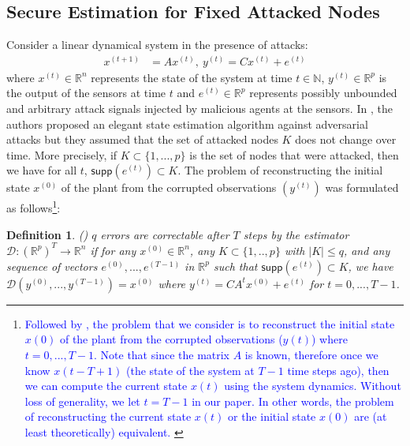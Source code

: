 \documentclass[twocolumn]{autart}    %
\newtheorem{Def}{\bf{Definition}}
\newcommand{\rev}[1]{{\normalsize{{{\color{blue}#1}}}}}
\begin{document}
\subsection{Secure Estimation for Fixed Attacked Nodes \cite{Fawzi2014} }
\vspace{-0.4cm}
Consider a linear dynamical system in the presence of attacks:
\begin{eqnarray}
		x^{(t+1)} &= A x^{(t)}, ~y^{(t)} = C x ^{(t)} + e^{(t)}
		\label{eq:system_model}
\end{eqnarray}
where $x^{(t)}\in \mathbb{R}^n$ represents the state of the system at time $t\in \mathbb{N}$, $y^{(t)} \in \mathbb{R}^p$ is the output of the sensors at time $t$ and $e^{(t)} \in \mathbb{R}^p $ represents \rev{possibly unbounded and arbitrary} attack signals injected by malicious agents at the sensors. In \cite{Fawzi2014}, the authors proposed an elegant state estimation algorithm against adversarial attacks but they assumed that the set of attacked nodes $K$ does not change over time. More precisely, if $K \subset \{1, ..., p\}$ is the set of nodes that were attacked, then we have for all $t$, $\textsf{supp}(e^{(t)})\subset K$. The problem of reconstructing the initial state $x^{(0)}$ of the plant from the corrupted observations $( y^{(t)})$ was formulated as follows\rev{\footnote{ \textcolor{blue}{Followed by \cite{Fawzi2014}, the problem that we consider is to reconstruct the initial state $x(0)$ of the plant from the corrupted observations ($y(t)$) where $t=0,...,T-1$. Note that since the matrix $A$ is known, therefore once we know $x(t-T+1)$ (the state of the system at $T-1$ time steps ago), then we can compute the current state $x(t)$ using the system dynamics. Without loss of generality, we let $t=T-1$ in our paper. In other words, the problem of reconstructing the current state $x(t)$ or the initial state $x(0)$ are (at least theoretically) equivalent. }}}:
\vspace{-0.2cm}
\begin{Def} \emph{(\hspace{1sp}\cite{Fawzi2014})} 
$q$ errors are correctable after $T$ steps by the \rev{estimator} $\mathcal{D}: {(\mathbb{R} ^p) } ^T  \rightarrow \mathbb{R}^n$ if for any $x^{(0)} \in \mathbb{R}^n$, any $K \subset \{1,.., p\} $ with $\lvert K \rvert \le q$, and any sequence of vectors $e^{(0)},...,e^{(T-1)}$ in $\mathbb{R}^p$ such that $\textsf{supp}(e^{(t)}) \subset K$, we have $\mathcal{D} (y^{(0)},...,y^{(T-1)}) = x^{(0)}$ where $y^{(t)} = CA^t x^{(0)} + e^{(t)}$ for $t=0,...,T-1$.
\end{Def}
\end{document}
